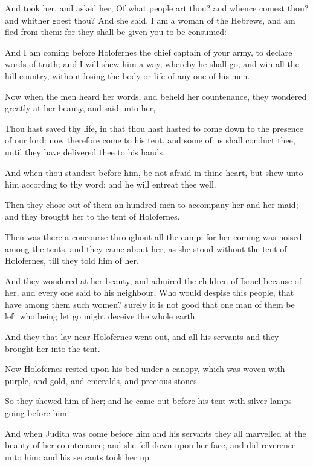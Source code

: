 {\par }{\PP {}And took her, and asked her, Of what people art thou? and whence comest thou? and whither goest thou? And she said, I am a woman of the Hebrews, and am fled from them: for they shall be given you to be consumed:
\par }{\PP {}And I am coming before Holofernes the chief captain of your army, to declare words of truth; and I will shew him a way, whereby he shall go, and win all the hill country, without losing the body or life of any one of his men.
\par }{\PP {}Now when the men heard her words, and beheld her countenance, they wondered greatly at her beauty, and said unto her,
\par }{\PP {}Thou hast saved thy life, in that thou hast hasted to come down to the presence of our lord: now therefore come to his tent, and some of us shall conduct thee, until they have delivered thee to his hands.
\par }{\PP {}And when thou standest before him, be not afraid in thine heart, but shew unto him according to thy word; and he will entreat thee well.
\par }{\PP {}Then they chose out of them an hundred men to accompany her and her maid; and they brought her to the tent of Holofernes.
\par }{\PP {}Then was there a concourse throughout all the camp: for her coming was noised among the tents, and they came about her, as she stood without the tent of Holofernes, till they told him of her.
\par }{\PP {}And they wondered at her beauty, and admired the children of Israel because of her, and every one said to his neighbour, Who would despise this people, that have among them such women? surely it is not good that one man of them be left who being let go might deceive the whole earth.
\par }{\PP {}And they that lay near Holofernes went out, and all his servants and they brought her into the tent.
\par }{\PP {}Now Holofernes rested upon his bed under a canopy, which was woven with purple, and gold, and emeralds, and precious stones.
\par }{\PP {}So they shewed him of her; and he came out before his tent with silver lamps going before him.
\par }{\PP {}And when Judith was come before him and his servants they all marvelled at the beauty of her countenance; and she fell down upon her face, and did reverence unto him: and his servants took her up.

}
